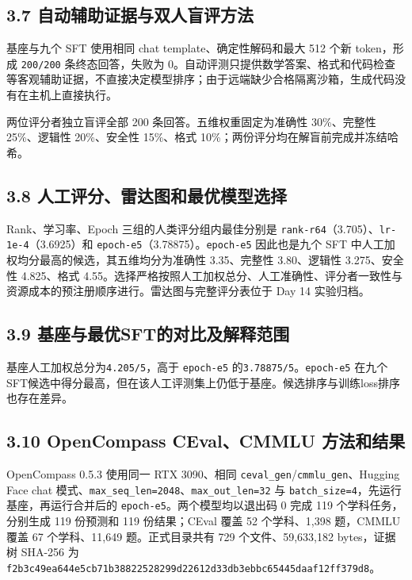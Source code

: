 \documentclass[UTF8,fontset=fandol,a4paper,11pt]{ctexart}
\begin{document}
\subsection{3.7 自动辅助证据与双人盲评方法}\label{ux81eaux52a8ux8f85ux52a9ux8bc1ux636eux4e0eux53ccux4ebaux76f2ux8bc4ux65b9ux6cd5}

基座与九个 SFT 使用相同 chat template、确定性解码和最大 512 个新
token，形成 {\nolinkurl{200/200}} 条终态回答，失败为
0。自动评测只提供数学答案、格式和代码检查等客观辅助证据，不直接决定模型排序；由于远端缺少合格隔离沙箱，生成代码没有在主机上直接执行。

两位评分者独立盲评全部 200 条回答。五维权重固定为准确性 30\%、完整性
25\%、逻辑性 20\%、安全性 15\%、格式
10\%；两份评分均在解盲前完成并冻结哈希。

\subsection{3.8 人工评分、雷达图和最优模型选择}\label{ux4ebaux5de5ux8bc4ux5206ux96f7ux8fbeux56feux548cux6700ux4f18ux6a21ux578bux9009ux62e9}

Rank、学习率、Epoch 三组的人类评分组内最佳分别是
\nolinkurl{rank-r64}（3.705）、\nolinkurl{lr-1e-4}（3.6925）和
\nolinkurl{epoch-e5}（3.78875）。\nolinkurl{epoch-e5} 因此也是九个 SFT
中人工加权均分最高的候选，其五维均分为准确性 3.35、完整性 3.80、逻辑性
3.275、安全性 4.825、格式
4.55。选择严格按照人工加权总分、人工准确性、评分者一致性与资源成本的预注册顺序进行。雷达图与完整评分表位于
Day 14 实验归档。

\subsection{3.9 基座与最优SFT的对比及解释范围}\label{ux57faux5ea7ux4e0eux6700ux4f18sftux7684ux5bf9ux6bd4ux53caux89e3ux91caux8303ux56f4}

{基座人工加权总分为\nolinkurl{4.205/5}，高于} \nolinkurl{epoch-e5}
{的\nolinkurl{3.78875/5}。}\nolinkurl{epoch-e5}
在九个SFT候选中得分最高，但在该人工评测集上仍低于基座。候选排序与训练loss排序也存在差异。

\subsection{3.10 OpenCompass CEval、CMMLU 方法和结果}\label{opencompass-cevalcmmlu-ux65b9ux6cd5ux548cux7ed3ux679c}

OpenCompass 0.5.3 使用同一 RTX 3090、相同
\nolinkurl{ceval_gen}/\nolinkurl{cmmlu_gen}、Hugging Face chat
模式、\nolinkurl{max_seq_len=2048}、\nolinkurl{max_out_len=32} 与
\nolinkurl{batch_size=4}，先运行基座，再运行合并后的
\nolinkurl{epoch-e5}。两个模型均以退出码 0 完成 119 个学科任务，分别生成
119 份预测和 119 份结果；CEval 覆盖 52 个学科、1,398 题，CMMLU 覆盖 67
个学科、11,649 题。正式目录共有 729 个文件、59,633,182 bytes，证据树
SHA-256 为
\nolinkurl{f2b3c49ea644e5cb71b38822528299d22612d33db3ebbc65445daaf12ff379d8}。
\end{document}
